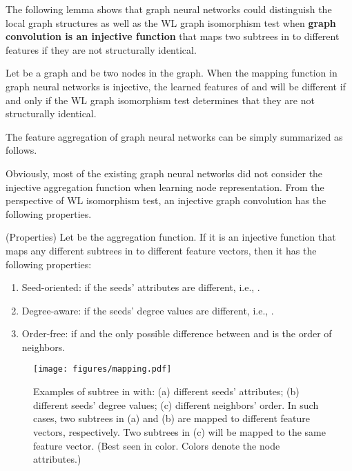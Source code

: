 \documentclass[sigconf]{acmart}
\begin{document}
The following lemma shows that graph neural networks could distinguish the local graph structures as well as the WL graph isomorphism test when \textbf{graph convolution is an injective function} that maps two subtrees in  to different features if they are not structurally identical.


\begin{lemma}
Let  be a graph and  be two nodes in the graph. When the mapping function  in graph neural networks is injective, the learned features of  and  will be different if and only if the WL graph isomorphism test determines that they are not structurally identical.
\end{lemma}




The feature aggregation of graph neural networks can be simply summarized as follows.

Obviously, most of the existing graph neural networks \cite{kipf2016semi, velickovic2017graph} did not consider the injective aggregation function when learning node representation. From the perspective of WL isomorphism test, an injective graph convolution has the following properties.

\begin{lemma} (Properties)
Let  be the aggregation function. If it is an injective function that maps any different subtrees in  to different feature vectors, then it has the following properties:
\begin{enumerate}[label=(\roman*)]
\item Seed-oriented:  if the seeds' attributes are different, i.e., .
\item Degree-aware:  if the seeds' degree values are different, i.e., .
\item Order-free:  if  and the only possible difference between  and  is the order of neighbors.
\end{enumerate}
\end{lemma}


\begin{figure}
\texttt{[image: figures/mapping.pdf]}
\caption{Examples of subtree in  with: (a) different seeds' attributes; (b) different seeds' degree values; (c) different neighbors' order. In such cases, two subtrees in (a) and (b) are mapped to different feature vectors, respectively. Two subtrees in (c) will be mapped to the same feature vector. (Best seen in color. Colors denote the node attributes.)}
\label{mapping}
\vspace{-3mm}
\end{figure}
\end{document}
